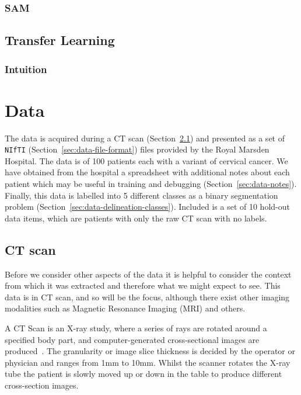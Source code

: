 \documentclass[11pt,twoside]{report}
\begin{document}
\subsection{SAM}\label{sect:sam}

\section{Transfer Learning}\label{sect:transfer-learning}

\subsection{Intuition}\label{sect:transfer-learning-intuition}

\chapter{Data}\label{sect:data}

The data is acquired during a CT scan (Section~\ref{sec:data-ct-scan}) and presented as a set of \texttt{NIfTI} (Section~\ref{sec:data-file-format}) files provided by the Royal Marsden Hospital. The data is of 100 patients each with a variant of cervical cancer. We have obtained from the hospital a spreadsheet with additional notes about each patient which may be useful in training and debugging (Section~\ref{sec:data-notes}). Finally, this data is labelled into 5 different classes as a binary segmentation problem (Section~\ref{sec:data-delineation-classes}). Included is a set of 10 hold-out data items, which are patients with only the raw CT scan with no labels.

\section{CT scan}\label{sec:data-ct-scan}

Before we consider other aspects of the data it is helpful to consider the context from which it was extracted and therefore what we might expect to see. This data is in CT scan, and so will be the focus, although there exist other imaging modalities such as Magnetic Resonance Imaging (MRI) and others.

A CT Scan is an X-ray study, where a series of rays are rotated around a specified body part, and computer-generated cross-sectional images are produced~\cite{file-formats}. The granularity or image slice thickness is decided by the operator or physician and ranges from 1mm to 10mm. Whilst the scanner rotates the X-ray tube the patient is slowly moved up or down in the table to produce different cross-section images.
\end{document}
